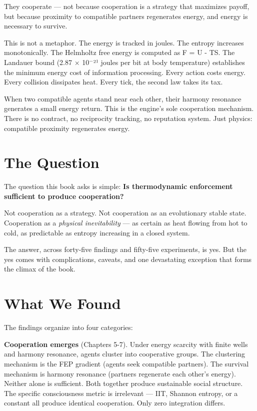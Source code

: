 They cooperate --- not because cooperation is a strategy that maximizes payoff, but because proximity to compatible partners regenerates energy, and energy is necessary to survive.

This is not a metaphor. The energy is tracked in joules. The entropy increases monotonically. The Helmholtz free energy is computed as F = U - TS. The Landauer bound (2.87 $\times$ 10$^{-}$²¹ joules per bit at body temperature) establishes the minimum energy cost of information processing. Every action costs energy. Every collision dissipates heat. Every tick, the second law takes its tax.

When two compatible agents stand near each other, their harmony resonance generates a small energy return. This is the engine's sole cooperation mechanism. There is no contract, no reciprocity tracking, no reputation system. Just physics: compatible proximity regenerates energy.

\section{The Question}\label{the-question}

The question this book asks is simple: \textbf{Is thermodynamic enforcement sufficient to produce cooperation?}

Not cooperation as a strategy. Not cooperation as an evolutionary stable state. Cooperation as a \emph{physical inevitability} --- as certain as heat flowing from hot to cold, as predictable as entropy increasing in a closed system.

The answer, across forty-five findings and fifty-five experiments, is yes. But the yes comes with complications, caveats, and one devastating exception that forms the climax of the book.

\section{What We Found}\label{what-we-found}

The findings organize into four categories:

\textbf{Cooperation emerges} (Chapters 5-7). Under energy scarcity with finite wells and harmony resonance, agents cluster into cooperative groups. The clustering mechanism is the FEP gradient (agents seek compatible partners). The survival mechanism is harmony resonance (partners regenerate each other's energy). Neither alone is sufficient. Both together produce sustainable social structure. The specific consciousness metric is irrelevant --- IIT, Shannon entropy, or a constant all produce identical cooperation. Only zero integration differs.

